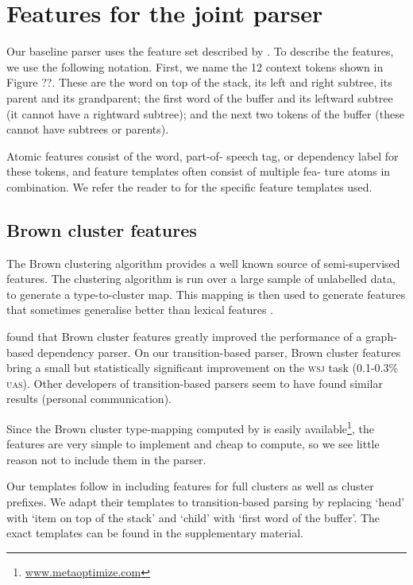 \documentclass[11pt,letterpaper]{article}
\begin{document}
\section{Features for the joint parser}

Our baseline parser uses the feature set described by \citet{zhang:11}.
To describe the features, we use the following notation. First, we name the
12 context tokens shown in Figure ??. These are the word on top of the stack, its
left and right subtree, its parent and its grandparent; the first word of the buffer
and its leftward subtree (it cannot have a rightward subtree); and the next two
tokens of the buffer (these cannot have subtrees or parents).

Atomic features consist of the word, part-of- speech tag, or dependency label
for these tokens, and feature templates often consist of multiple fea- ture atoms
in combination. We refer the reader to \citet{zhang:11} for the specific feature
templates used.

\subsection{Brown cluster features}

The Brown clustering algorithm \citep{clustering} provides a well known source
of semi-supervised features. The clustering algorithm is run over a large sample
of unlabelled data, to generate a type-to-cluster map. This mapping is then used
to generate features that sometimes generalise better than lexical features
\citet{turian}.

\citet{koo:10} found that Brown cluster features greatly improved the performance
of a graph-based dependency parser. On our transition-based parser, Brown cluster
features bring a small but statistically significant improvement on the \textsc{wsj}
task (0.1-0.3\% \textsc{uas}).  Other developers of transition-based parsers
seem to have found similar results (personal communication).

Since the Brown cluster type-mapping computed by \citet{turian:10} is easily
available\footnote{\url{www.metaoptimize.com}}, the features are very simple
to implement and cheap to compute, so we see little reason not to include them
in the parser.

Our templates follow \citet{koo:10} in including features for full clusters as
well as cluster prefixes. We adapt their templates to transition-based parsing
by replacing `head' with `item on top of the stack' and `child' with `first word
of the buffer'. The exact templates can be found in the supplementary material.
\end{document}
